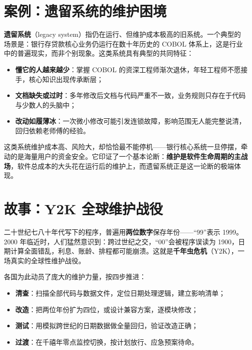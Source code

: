 \documentclass[
]{ctexbook}
\providecommand{\tightlist}{\setlength{\itemsep}{0pt}\setlength{\parskip}{0pt} }
\begin{document}
\section{案例：遗留系统的维护困境}\label{ux6848ux4f8bux9057ux7559ux7cfbux7edfux7684ux7ef4ux62a4ux56f0ux5883}

\textbf{遗留系统}（legacy
system）指仍在运行、但维护成本极高的旧系统。一个典型的场景是：银行存贷款核心业务仍运行在数十年历史的
COBOL
体系上，这是行业中的普遍现实，而非个别现象。这类系统具有典型的共同特征：

\begin{itemize}
\tightlist
\item
  \textbf{懂它的人越来越少}：掌握 COBOL
  的资深工程师渐次退休，年轻工程师不愿接手，核心知识出现传承断层；
\item
  \textbf{文档缺失或过时}：多年修改后文档与代码严重不一致，业务规则只存在于代码与少数人的头脑中；
\item
  \textbf{改动如履薄冰}：一次微小修改可能引发连锁故障，影响范围无人能完整说清，回归依赖老师傅的经验。
\end{itemize}

这类系统维护成本高、风险大，却恰恰最不能停机------银行核心系统一旦停摆，牵动的是海量用户的资金安全。它印证了一个基本论断：\textbf{维护是软件生命周期的主战场}，软件总成本的大头花在运行后的维护上，而遗留系统正是这一论断的极端体现。

\section{故事：Y2K
全球维护战役}\label{ux6545ux4e8by2k-ux5168ux7403ux7ef4ux62a4ux6218ux5f79}

二十世纪七八十年代写下的程序，普遍用\textbf{两位数字}保存年份------``99''表示
1999。2000 年临近时，人们猛然意识到：跨过世纪之交，``00''会被程序误读为
1900，日期计算全面错乱，利息、账龄、排程都可能崩溃。这就是\textbf{千年虫危机}（Y2K），一场真实的全球性维护战役。

各国为此动员了庞大的维护力量，按四步推进：

\begin{itemize}
\tightlist
\item
  \textbf{清查}：扫描全部代码与数据文件，定位日期处理逻辑，建立影响清单；
\item
  \textbf{改造}：把两位年份扩为四位，或设计兼容方案，逐模块修改；
\item
  \textbf{测试}：用模拟跨世纪的日期数据做全量回归，验证改造正确；
\item
  \textbf{过渡}：在千禧年零点监控切换，按计划放行、应急预案待命。
\end{itemize}
\end{document}
